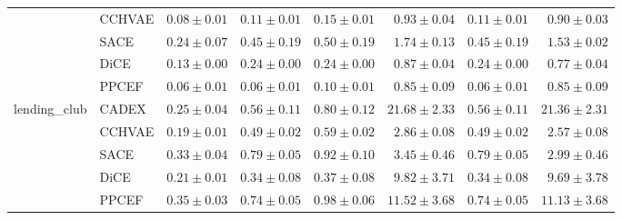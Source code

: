 \begin{table}[ht]
\begin{center}
\begin{sc}
\begin{scriptsize}
\begin{tabular}{l|l|rrrrrr}
 & CCHVAE & $0.08\pm{0.01}$ & $0.11\pm{0.01}$ & $0.15\pm{0.01}$ & $0.93\pm{0.04}$ & $0.11\pm{0.01}$ & $0.90\pm{0.03}$ \\
 & SACE & $0.24\pm{0.07}$ & $0.45\pm{0.19}$ & $0.50\pm{0.19}$ & $1.74\pm{0.13}$ & $0.45\pm{0.19}$ & $1.53\pm{0.02}$ \\
 & DiCE & $0.13\pm{0.00}$ & $0.24\pm{0.00}$ & $0.24\pm{0.00}$ & $0.87\pm{0.04}$ & $0.24\pm{0.00}$ & $0.77\pm{0.04}$ \\
 & PPCEF & $\boldsymbol{0.06\pm{0.01}}$ & $\boldsymbol{0.06\pm{0.01}}$ & $\boldsymbol{0.10\pm{0.01}}$ & $0.85\pm{0.09}$ & $\boldsymbol{0.06\pm{0.01}}$ & $0.85\pm{0.09}$ \\
\midrule
\multirow{5}{*}{lending\_club} & CADEX & $0.25\pm{0.04}$ & $0.56\pm{0.11}$ & $0.80\pm{0.12}$ & $21.68\pm{2.33}$ & $0.56\pm{0.11}$ & $21.36\pm{2.31}$ \\
 & CCHVAE & $\boldsymbol{0.19\pm{0.01}}$ & $0.49\pm{0.02}$ & $0.59\pm{0.02}$ & $\boldsymbol{2.86\pm{0.08}}$ & $0.49\pm{0.02}$ & $\boldsymbol{2.57\pm{0.08}}$ \\
 & SACE & $0.33\pm{0.04}$ & $0.79\pm{0.05}$ & $0.92\pm{0.10}$ & $3.45\pm{0.46}$ & $0.79\pm{0.05}$ & $2.99\pm{0.46}$ \\
 & DiCE & $0.21\pm{0.01}$ & $\boldsymbol{0.34\pm{0.08}}$ & $\boldsymbol{0.37\pm{0.08}}$ & $9.82\pm{3.71}$ & $\boldsymbol{0.34\pm{0.08}}$ & $9.69\pm{3.78}$ \\
 & PPCEF & $0.35\pm{0.03}$ & $0.74\pm{0.05}$ & $0.98\pm{0.06}$ & $11.52\pm{3.68}$ & $0.74\pm{0.05}$ & $11.13\pm{3.68}$ \\
\bottomrule
\end{tabular}
\end{scriptsize}
\end{sc}
\end{center}
\end{table}

